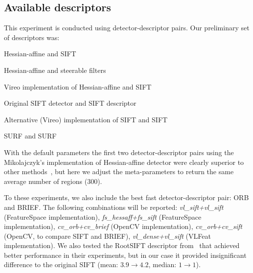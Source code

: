 \documentclass[review]{elsarticle}
\begin{document}

%
\subsection{Available descriptors}
%
This experiment is conducted using detector-descriptor
pairs. Our preliminary set of descriptors was:
\begin{compactenum}
\item Hessian-affine and SIFT
\item Hessian-affine and steerable filters
\item Vireo implementation of Hessian-affine and SIFT
\item Original SIFT detector and SIFT descriptor
\item Alternative (Vireo) implementation of SIFT and SIFT
\item SURF and SURF
\end{compactenum}
With the default parameters the first two detector-descriptor
pairs using the
Mikolajczyk's implementation of Hessian-affine detector were
clearly superior to other methods~\cite{LanKanKam:2012}, but here
we adjust the meta-parameters to
return the same average number of regions (300).

To these experiments, we also include the best fast detector-descriptor
pair: ORB and BRIEF.
The following combinations will be reported:
{\em vl\_sift+vl\_sift} (FeatureSpace implementation),
{\em fs\_hessaff+fs\_sift} (FeatureSpace implementation),
{\em cv\_orb+cv\_brief} (OpenCV implementation),
{\em cv\_orb+cv\_sift} (OpenCV, to compare SIFT and BRIEF),
{\em vl\_dense+vl\_sift} (VLFeat implementation).
%
We also tested the RootSIFT descriptor
from~\cite{AraZis:2012} that achieved better performance in
their experiments, but in our case it
provided insignificant difference to the original SIFT
(mean: $3.9 \rightarrow 4.2$, median: $1 \rightarrow 1$). 

%
\end{document}
